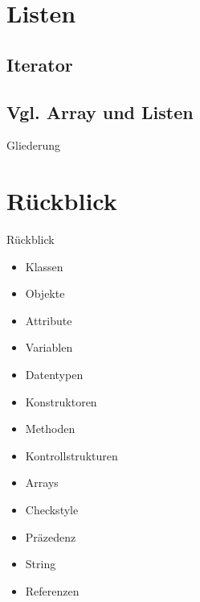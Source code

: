 \documentclass[18pt]{beamer}
\begin{document}
\section{Listen}

\subsection{Iterator}

\subsection{Vgl. Array und Listen}



\begin{frame}
\titlepage
\end{frame}

\begin{frame}{Gliederung}
\tableofcontents
\end{frame}
\section{Rückblick}
\begin{frame}{Rückblick}
 \begin{itemize}
  \item Klassen
  \item Objekte
  \item Attribute
  \item Variablen
  \item Datentypen
  \item Konstruktoren
  \item Methoden
  \item Kontrollstrukturen
  \item Arrays
  \item Checkstyle
  \item Präzedenz
  \item String
  \item Referenzen
 \end{itemize}
\end{frame}
\end{document}
